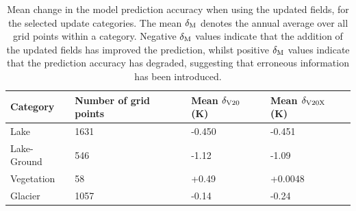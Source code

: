 \documentclass[twocolumn]{article}
\begin{document}
\begin{table}[t]
	\centering
	\begin{tabular}{llll}
		Category     & Number of grid points         & Mean $\delta_{\rm V20}$ (K) & Mean $\delta_{\rm V20X}$ (K)\\
		\hline
		Lake & 1631 & -0.450 & -0.451\\
		Lake-Ground & 546 & -1.12& -1.09 \\
		Vegetation  & 58 & +0.49 & +0.0048\\
		Glacier & 1057 & -0.14 & -0.24\\
		\hline
	\end{tabular}
	\caption{Mean change in the model prediction accuracy when using the updated fields,  for the selected update categories. The mean $\delta_{\rm M}$ denotes the annual average over all grid points within a category. Negative $\delta_{\rm M}$ values indicate that the addition of the updated fields has improved the prediction, whilst positive $\delta_{\rm M}$ values indicate that the prediction accuracy has degraded, suggesting that erroneous information has been introduced. }
	\label{tab:V1520_results}
\end{table}
\end{document}
